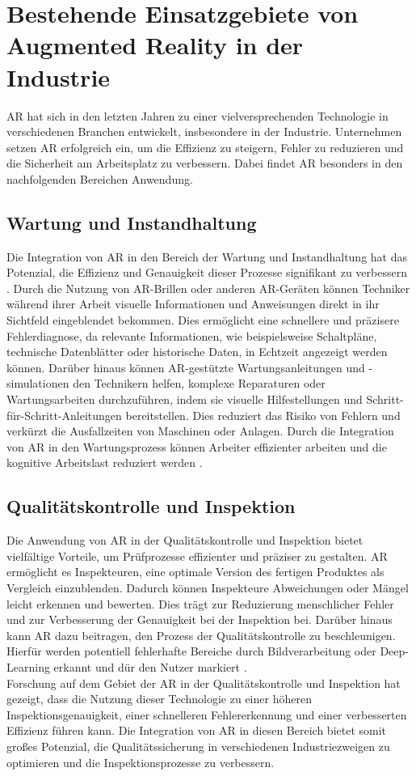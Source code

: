 \section{Bestehende Einsatzgebiete von Augmented Reality in der Industrie}

AR hat sich in den letzten Jahren zu einer vielversprechenden Technologie in
verschiedenen Branchen entwickelt, insbesondere in der Industrie. Unternehmen
setzen AR erfolgreich ein, um die Effizienz zu steigern, Fehler zu reduzieren
und die Sicherheit am Arbeitsplatz zu verbessern. Dabei findet AR besonders in
den nachfolgenden Bereichen Anwendung.

\subsection{Wartung und Instandhaltung}
Die Integration von AR in den Bereich der Wartung und Instandhaltung hat das
Potenzial, die Effizienz und Genauigkeit dieser Prozesse signifikant zu
verbessern \cite{liu2022probing}. Durch die Nutzung von AR-Brillen oder anderen
AR-Geräten können Techniker während ihrer Arbeit visuelle Informationen und
Anweisungen direkt in ihr Sichtfeld eingeblendet bekommen. Dies ermöglicht eine
schnellere und präzisere Fehlerdiagnose, da relevante Informationen, wie
beispielsweise Schaltpläne, technische Datenblätter oder historische Daten, in
Echtzeit angezeigt werden können. Darüber hinaus können AR-gestützte
Wartungsanleitungen und -simulationen den Technikern helfen, komplexe
Reparaturen oder Wartungsarbeiten durchzuführen, indem sie visuelle
Hilfestellungen und Schritt-für-Schritt-Anleitungen bereitstellen.
\cite{4079262} Dies reduziert das Risiko von Fehlern und verkürzt die
Ausfallzeiten von Maschinen oder Anlagen. Durch die Integration von AR in den
Wartungsprozess können Arbeiter effizienter arbeiten und die kognitive
Arbeitslast reduziert werden \cite{5620905}.

\subsection{Qualitätskontrolle und Inspektion}
Die Anwendung von AR in der Qualitätskontrolle und Inspektion bietet
vielfältige Vorteile, um Prüfprozesse effizienter und präziser zu gestalten. AR
ermöglicht es Inspekteuren, eine optimale Version des fertigen Produktes als
Vergleich einzublenden. Dadurch können Inspekteure Abweichungen oder Mängel
leicht erkennen und bewerten. Dies trägt zur Reduzierung menschlicher Fehler
und zur Verbesserung der Genauigkeit bei der Inspektion bei. Darüber hinaus
kann AR dazu beitragen, den Prozess der Qualitätskontrolle zu beschleunigen.
Hierfür werden potentiell fehlerhafte Bereiche durch Bildverarbeitung oder
Deep-Learning erkannt und dür den Nutzer markiert \cite{9112336}. \\Forschung
auf dem Gebiet der AR in der Qualitätskontrolle und Inspektion hat gezeigt,
dass die Nutzung dieser Technologie zu einer höheren Inspektionsgenauigkeit,
einer schnelleren Fehlererkennung und einer verbesserten Effizienz führen kann.
Die Integration von AR in diesen Bereich bietet somit großes Potenzial, die
Qualitätssicherung in verschiedenen Industriezweigen zu optimieren und die
Inspektionsprozesse zu verbessern.\cite{etonam2019augmented}